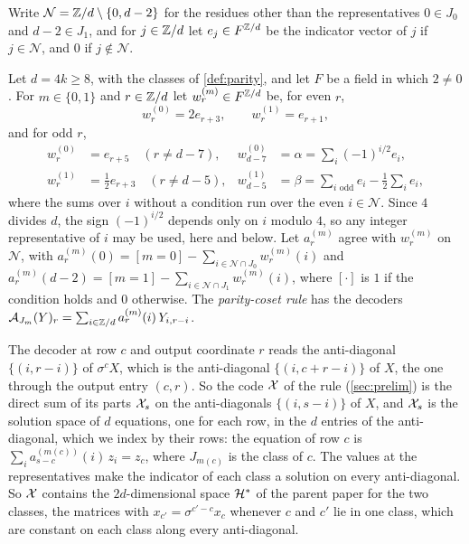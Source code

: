 Write $\mathcal N=\mathbb{Z}/d\setminus\{0,d-2\}$ for the residues other than the representatives $0\in J_0$ and $d-2\in J_1$,
and for $j\in\mathbb{Z}/d$ let $e_j\in F^{\mathbb{Z}/d}$ be the indicator vector of $j$ if $j\in\mathcal N$, and $0$ if
$j\notin\mathcal N$.

\begin{definition}\label{def:parity-rule}
\par{}\par
\smallskip\noindent\ignorespaces
Let $d=4k\ge8$, with the classes of \cref{def:parity}, and let $F$ be a field in which $2\ne0$. For $m\in\{0,1\}$ and
$r\in\mathbb{Z}/d$ let $w^{(m)}_r\in F^{\mathbb{Z}/d}$ be, for even $r$,
\[
  w^{(0)}_r=2e_{r+3},\qquad w^{(1)}_r=e_{r+1},
\]
and for odd $r$,
\begin{align*}
  w^{(0)}_r&=e_{r+5}\quad(r\ne d-7), & w^{(0)}_{d-7}&=\alpha=\textstyle\sum_i(-1)^{i/2}e_i,\\
  w^{(1)}_r&=\tfrac12e_{r+3}\quad(r\ne d-5), & w^{(1)}_{d-5}&=\beta=\textstyle\sum_{i\text{ odd}}e_i-\frac12\sum_ie_i,
\end{align*}
where the sums over $i$ without a condition run over the even $i\in\mathcal N$. Since $4$ divides $d$, the sign
$(-1)^{i/2}$ depends only on $i$ modulo $4$, so any integer representative of $i$ may be used, here and below. Let
$a^{(m)}_r$ agree with $w^{(m)}_r$ on $\mathcal N$, with $a^{(m)}_r(0)=[m=0]-\sum_{i\in\mathcal N\cap J_0}w^{(m)}_r(i)$
and $a^{(m)}_r(d-2)=[m=1]-\sum_{i\in\mathcal N\cap J_1}w^{(m)}_r(i)$, where $[\cdot]$ is $1$ if the condition holds
and $0$ otherwise. The \emph{parity-coset rule} has the decoders $\mathcal{A}_{J_m}(Y)_r=\sum_{i\in\mathbb{Z}/d}a^{(m)}_r(i)\,Y_{i,r-i}$.
\end{definition}

The decoder at row $c$ and output coordinate $r$ reads the anti-diagonal $\{(i,r-i)\}$ of $\sigma^cX$, which is the
anti-diagonal $\{(i,c+r-i)\}$ of $X$, the one through the output entry $(c,r)$. So the code $\mathcal{X}$ of the rule (\cref{sec:prelim})
is the direct sum of its parts $\mathcal{X}_s$ on the anti-diagonals $\{(i,s-i)\}$ of $X$, and $\mathcal{X}_s$ is the solution space of $d$
equations, one for each row, in the $d$ entries of the anti-diagonal, which we index by their rows: the equation of row
$c$ is $\sum_ia^{(m(c))}_{s-c}(i)\,z_i=z_c$, where $J_{m(c)}$ is the class of $c$. The values at the representatives make
the indicator of each class a solution on every anti-diagonal. So $\mathcal{X}$ contains the $2d$-dimensional space $\mathcal{H}^*$ of
the parent paper for the two classes, the matrices with $x_{c'}=\sigma^{c'-c}x_c$ whenever $c$ and $c'$ lie in one
class, which are constant on each class along every anti-diagonal.

